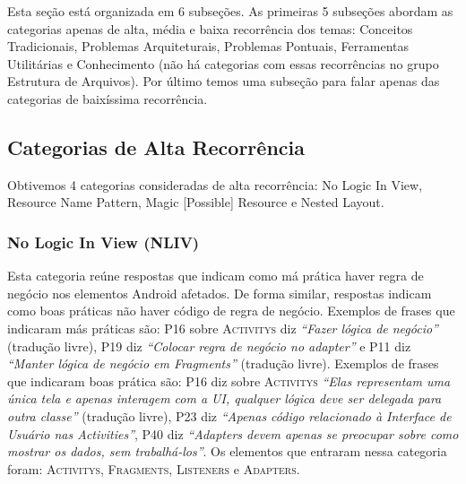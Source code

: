 Esta se\c{c}\~ao est\'a organizada em 6 subse\c{c}\~oes. As primeiras 5 subse\c{c}\~oes abordam as categorias apenas de alta, m\'edia e baixa recorr\^encia dos temas: Conceitos Tradicionais, Problemas Arquiteturais, Problemas Pontuais, Ferramentas Utilit\'arias e Conhecimento (n\~ao h\'a categorias com essas recorr\^encias no grupo Estrutura de Arquivos). Por \'ultimo temos uma subse\c{c}\~ao para falar apenas das categorias de baix\'issima recorr\^encia.

\subsection{Categorias de Alta Recorr\^encia}
Obtivemos 4 categorias consideradas de alta recorr\^encia: No Logic In View, Resource Name Pattern, Magic [Possible] Resource e Nested Layout.

\subsubsection{No Logic In View (NLIV)}
Esta categoria re\'une respostas que indicam como m\'a pr\'atica haver regra de neg\'ocio nos elementos Android afetados. De forma similar, respostas indicam como boas pr\'aticas n\~ao haver c\'odigo de regra de neg\'ocio. Exemplos de frases que indicaram m\'as pr\'aticas s\~ao: P16 sobre \textsc{Activitys} diz \textit{``Fazer l\'ogica de neg\'ocio''} (tradu\c{c}\~ao livre), P19 diz \textit{``Colocar regra de neg\'ocio no adapter''} e P11 diz \textit{``Manter l\'ogica de neg\'ocio em Fragments''} (tradu\c{c}\~ao livre). Exemplos de frases que indicaram boas pr\'atica s\~ao: P16 diz sobre \textsc{Activitys} \textit{``Elas representam uma \'unica tela e apenas interagem com a UI, qualquer l\'ogica deve ser delegada para outra classe''} (tradu\c{c}\~ao livre), P23 diz \textit{``Apenas c\'odigo relacionado \`a Interface de Usu\'ario nas Activities''}, P40 diz \textit{``Adapters devem apenas se preocupar sobre como mostrar os dados, sem trabalh\'a-los''}. Os elementos que entraram nessa categoria foram: \textsc{Activitys}, \textsc{Fragments}, \textsc{Listeners} e \textsc{Adapters}. 



